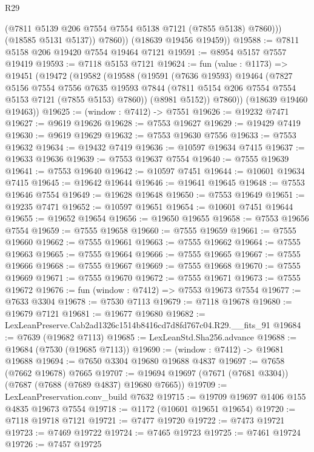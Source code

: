 \begin{lexlean}{R29}
\begin{coremodule}
                (@7811 @5139 @206 @7554 @7554 @5138 @7121 (@7855 @5138) @7860)))
            (@18585 @5131 @5137))
          @7860))
      (@18639 @19456 @19459))
@19588 := @7811 @5158 @206 @19420 @7554 @19464 @7121
@19591 := @8954 @5157 @7557 @19419
@19593 := @7118 @5153 @7121
@19624 := fun (value : @1173) =>
  @19451
    (@19472
      (@19582
        (@19588
          (@19591
            (@7636 @19593)
            @19464
            (@7827
              @5156
              @7554
              @7556
              @7635
              @19593
              @7844
              (@7811 @5154 @206 @7554 @7554 @5153 @7121 (@7855 @5153) @7860))
            (@8981 @5152))
          @7860))
      (@18639 @19460 @19463))
@19625 := (window : @7412) -> @7551
@19626 := @19232 @7471
@19627 := @9619 @19626
@19628 := @7553 @19627
@19629 := @19429 @7419
@19630 := @9619 @19629
@19632 := @7553 @19630 @7556
@19633 := @7553 @19632
@19634 := @19432 @7419
@19636 := @10597 @19634 @7415
@19637 := @19633 @19636
@19639 := @7553 @19637 @7554
@19640 := @7555 @19639
@19641 := @7553 @19640
@19642 := @10597 @7451
@19644 := @10601 @19634 @7415
@19645 := @19642 @19644
@19646 := @19641 @19645
@19648 := @7553 @19646 @7554
@19649 := @19628 @19648
@19650 := @7553 @19649
@19651 := @19235 @7471
@19652 := @10597 @19651
@19654 := @10601 @7451 @19644
@19655 := @19652 @19654
@19656 := @19650 @19655
@19658 := @7553 @19656 @7554
@19659 := @7555 @19658
@19660 := @7555 @19659
@19661 := @7555 @19660
@19662 := @7555 @19661
@19663 := @7555 @19662
@19664 := @7555 @19663
@19665 := @7555 @19664
@19666 := @7555 @19665
@19667 := @7555 @19666
@19668 := @7555 @19667
@19669 := @7555 @19668
@19670 := @7555 @19669
@19671 := @7555 @19670
@19672 := @7555 @19671
@19673 := @7555 @19672
@19676 := fun (window : @7412) => @7553 @19673 @7554
@19677 := @7633 @3304
@19678 := @7530 @7113
@19679 := @7118 @19678
@19680 := @19679 @7121
@19681 := @19677 @19680
@19682 := LexLeanPreserve.Cab2ad1326c1514b8416cd7d8fd767c04.R29.__fits_91
@19684 := @7639 (@19682 @7113)
@19685 := LexLeanStd.Sha256.advance
@19688 := @19684 (@7530 (@19685 @7113))
@19690 := (window : @7412) -> @19681 @19688
@19694 := @7650 @3304 @19680 @19688 @4837
@19697 := @7658 (@7662 @19678) @7665
@19707 := @19694 @19697 (@7671 (@7681 @3304)) (@7687 (@7688 (@7689 @4837) @19680 @7665))
@19709 := LexLeanPreservation.conv_build @7632
@19715 := @19709 @19697 @1406 @155 @4835 @19673 @7554
@19718 := @1172 (@10601 @19651 @19654)
@19720 := @7118 @19718 @7121
@19721 := @7477 @19720
@19722 := @7473 @19721
@19723 := @7469 @19722
@19724 := @7465 @19723
@19725 := @7461 @19724
@19726 := @7457 @19725

\end{coremodule}
\end{lexlean}
